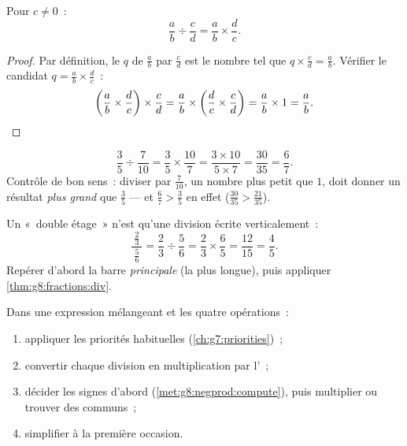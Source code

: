 \begin{theorem}\label{thm:g8:fractions:div}
Pour $c \neq 0$~:
\[
\frac{a}{b} \div \frac{c}{d} = \frac{a}{b} \times \frac{d}{c} .
\]
\end{theorem}

\begin{proof}
Par définition, le  $q$ de $\frac ab$ par $\frac cd$ est le
nombre tel que $q \times \frac cd = \frac ab$. Vérifier le candidat
$q = \frac ab \times \frac dc$~:
\[
\left(\frac ab \times \frac dc\right) \times \frac cd
= \frac ab \times \left(\frac dc \times \frac cd\right)
= \frac ab \times 1 = \frac ab . \qedhere
\]
\end{proof}

\begin{example}\label{ex:g8:fractions:div}
\[
\frac{3}{5} \div \frac{7}{10}
= \frac{3}{5} \times \frac{10}{7}
= \frac{3 \times 10}{5 \times 7}
= \frac{30}{35} = \frac{6}{7}.
\]
Contrôle de bon sens~: diviser par $\frac{7}{10}$, un nombre plus
petit que $1$, doit donner un résultat \emph{plus grand} que
$\frac35$ --- et $\frac67 > \frac35$ en effet
($\frac{30}{35} > \frac{21}{35}$).
\end{example}

\begin{example}\label{ex:g8:fractions:complex}
Un «~double étage~» n'est qu'une division écrite verticalement~:
\[
\frac{\ \frac{2}{3}\ }{\ \frac{5}{6}\ }
= \frac{2}{3} \div \frac{5}{6}
= \frac{2}{3} \times \frac{6}{5}
= \frac{12}{15} = \frac{4}{5}.
\]
Repérer d'abord la barre \emph{principale} (la plus longue), puis
appliquer \cref{thm:g8:fractions:div}.
\end{example}

\begin{method}\label{met:g8:fractions:mixed}
Dans une expression mélangeant  et les quatre
opérations~:
\begin{enumerate}
  \item appliquer les priorités habituelles
        (\cref{ch:g7:priorities})~;
  \item convertir chaque division en multiplication par l'~;
  \item décider les signes d'abord (\cref{met:g8:negprod:compute}),
        puis multiplier ou trouver des  communs~;
  \item simplifier à la première occasion.
\end{enumerate}
\end{method}

